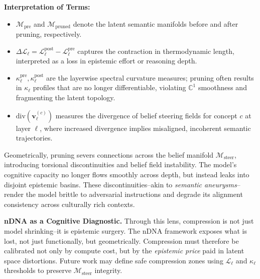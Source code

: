 \vspace{0.5em}
\noindent\textbf{Interpretation of Terms:}
\begin{itemize}[leftmargin=1.5em]
    \item $\mathcal{M}_{\text{pre}}$ and $\mathcal{M}_{\text{pruned}}$ denote the latent semantic manifolds before and after pruning, respectively.
    \item $\Delta \mathcal{L}_\ell = \mathcal{L}_\ell^{\text{post}} - \mathcal{L}_\ell^{\text{pre}}$ captures the contraction in thermodynamic length, interpreted as a loss in epistemic effort or reasoning depth.
    \item $\kappa_\ell^{\text{pre}}, \kappa_\ell^{\text{post}}$ are the layerwise spectral curvature measures; pruning often results in $\kappa_\ell$ profiles that are no longer differentiable, violating $\mathbb{C}^1$ smoothness and fragmenting the latent topology.
    \item $\mathrm{div}(\mathbf{v}_\ell^{(c)})$ measures the divergence of belief steering fields for concept $c$ at layer $\ell$, where increased divergence implies misaligned, incoherent semantic trajectories.
\end{itemize}

\vspace{0.5em}
\noindent Geometrically, pruning severs connections across the belief manifold $\mathcal{M}_{\text{steer}}$, introducing torsional discontinuities and belief field instability. The model’s cognitive capacity no longer flows smoothly across depth, but instead leaks into disjoint epistemic basins. These discontinuities--akin to \emph{semantic aneurysms}--render the model brittle to adversarial instructions and degrade its alignment consistency across culturally rich contexts.


\vspace{1em}
\noindent\textbf{nDNA as a Cognitive Diagnostic.} Through this lens, compression is not just model shrinking--it is epistemic surgery. The nDNA framework exposes what is lost, not just functionally, but geometrically. Compression must therefore be calibrated not only by compute cost, but by the \emph{epistemic price} paid in latent space distortions. Future work may define safe compression zones using $\mathcal{L}_\ell$ and $\kappa_\ell$ thresholds to preserve $\mathcal{M}_{\text{steer}}$ integrity.














